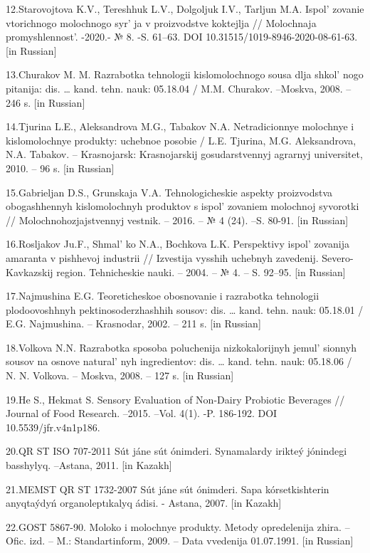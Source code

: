 {12.Starovojtova K.V., Tereshhuk L.V., Dolgoljuk I.V., Tarljun M.A.
Ispol' zovanie vtorichnogo molochnogo
syr' ja v proizvodstve koktejlja // Molochnaja
promyshlennost'. -2020.- № 8. -S. 61--63. DOI
10.31515/1019-8946-2020-08-61-63. {[}in Russian{]}

13.Churakov M. M. Razrabotka tehnologii kislomolochnogo sousa dlja
shkol' nogo pitanija: dis. \ldots{} kand. tehn. nauk:
05.18.04 / M.M. Churakov. --Moskva, 2008. --246 s. {[}in Russian{]}

14.Tjurina L.E., Aleksandrova M.G., Tabakov N.A. Netradicionnye
molochnye i kislomolochnye produkty: uchebnoe posobie / L.E. Tjurina,
M.G. Aleksandrova, N.A. Tabakov. -- Krasnojarsk: Krasnojarskij
gosudarstvennyj agrarnyj universitet, 2010. -- 96 s. {[}in Russian{]}

15.Gabrieljan D.S., Grunskaja V.A. Tehnologicheskie aspekty proizvodstva
obogashhennyh kislomolochnyh produktov s ispol' zovaniem
molochnoj syvorotki // Molochnohozjajstvennyj vestnik. -- 2016. -- № 4
(24). --S. 80-91. {[}in Russian{]}

16.Rosljakov Ju.F., Shmal' ko N.A., Bochkova L.K.
Perspektivy ispol' zovanija amaranta v pishhevoj
industrii // Izvestija vysshih uchebnyh zavedenij. Severo-Kavkazskij
region. Tehnicheskie nauki. -- 2004. -- № 4. -- S. 92--95. {[}in
Russian{]}

17.Najmushina E.G. Teoreticheskoe obosnovanie i razrabotka tehnologii
plodoovoshhnyh pektinosoderzhashhih sousov: dis. \ldots{} kand. tehn.
nauk: 05.18.01 / E.G. Najmushina. -- Krasnodar, 2002. -- 211 s. {[}in
Russian{]}

18.Volkova N.N. Razrabotka sposoba poluchenija nizkokalorijnyh
jemul' sionnyh sousov na osnove
natural' nyh ingredientov: dis. \ldots{} kand. tehn.
nauk: 05.18.06 / N. N. Volkova. -- Moskva, 2008. -- 127 s. {[}in
Russian{]}

19.He S., Hekmat S. Sensory Evaluation of Non-Dairy Probiotic Beverages
// Journal of Food Research. --2015. --Vol. 4(1). -P. 186-192. DOI
10.5539/jfr.v4n1p186.

20.QR ST ISO 707-2011 Sút jáne sút ónimderi. Synamalardy irikteý
jónindegi basshylyq. --Astana, 2011. {[}in Kazakh{]}

21.MEMST QR ST 1732-2007 Sút jáne sút ónimderi. Sapa kórsetkishterin
anyqtaýdyń organoleptıkalyq ádisi. - Astana, 2007. {[}in Kazakh{]}

22.GOST 5867-90. Moloko i molochnye produkty. Metody opredelenija zhira.
-- Ofic. izd. -- M.: Standartinform, 2009. -- Data vvedenija 01.07.1991.
{[}in Russian{]}

}
